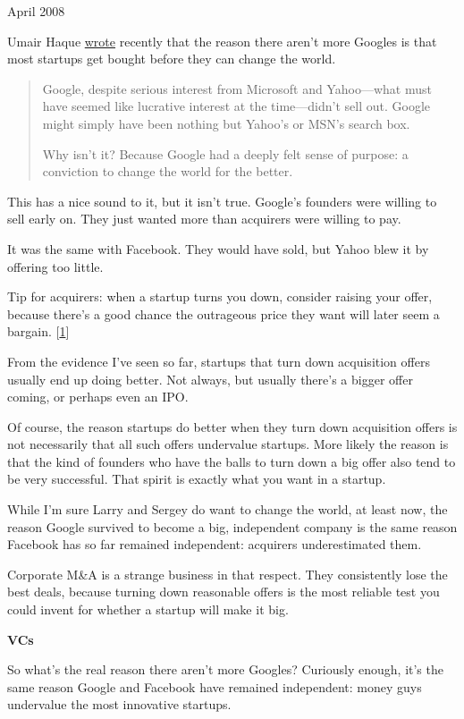 April 2008

Umair Haque
\href{http://discussionleader.hbsp.com/haque/2008/04/i_agree_and_i.html}{wrote}
recently that the reason there aren't more Googles is that most startups
get bought before they can change the world.

\begin{quote}
Google, despite serious interest from Microsoft and Yahoo---what must
have seemed like lucrative interest at the time---didn't sell out.
Google might simply have been nothing but Yahoo's or MSN's search box.

Why isn't it? Because Google had a deeply felt sense of purpose: a
conviction to change the world for the better.
\end{quote}

This has a nice sound to it, but it isn't true. Google's founders were
willing to sell early on. They just wanted more than acquirers were
willing to pay.

It was the same with Facebook. They would have sold, but Yahoo blew it
by offering too little.

Tip for acquirers: when a startup turns you down, consider raising your
offer, because there's a good chance the outrageous price they want will
later seem a bargain. {[}\hyperref[f1n]{1}{]}

From the evidence I've seen so far, startups that turn down acquisition
offers usually end up doing better. Not always, but usually there's a
bigger offer coming, or perhaps even an IPO.

Of course, the reason startups do better when they turn down acquisition
offers is not necessarily that all such offers undervalue startups. More
likely the reason is that the kind of founders who have the balls to
turn down a big offer also tend to be very successful. That spirit is
exactly what you want in a startup.

While I'm sure Larry and Sergey do want to change the world, at least
now, the reason Google survived to become a big, independent company is
the same reason Facebook has so far remained independent: acquirers
underestimated them.

Corporate M\&A is a strange business in that respect. They consistently
lose the best deals, because turning down reasonable offers is the most
reliable test you could invent for whether a startup will make it big.

\textbf{VCs}

So what's the real reason there aren't more Googles? Curiously enough,
it's the same reason Google and Facebook have remained independent:
money guys undervalue the most innovative startups.

